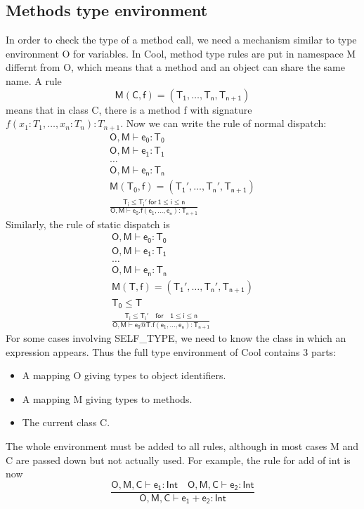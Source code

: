 \subsection{Methods type environment}
In order to check the type of a method call, we need a mechanism similar to type environment O for variables. In Cool, method type rules are put in namespace M differnt from O, which means that a method and an object can share the same name. A rule 
\begin{equation*}
\mathsf{M(C,f) = (T_1,\dots,T_n,T_{n+1})}
\end{equation*}
means that in class C, there is a method f with signature $f(x_1:T_1,\dots,x_n:T_n):T_{n+1}$. Now we can write the rule of normal dispatch:
\begin{gather*}
\mathsf{O,M\vdash e_0:T_0}\\
\mathsf{O,M\vdash e_1:T_1}\\
\dots\\
\mathsf{O,M\vdash e_n:T_n}\\
\mathsf{M(T_0,f) = (T_1',\dots,T_n', T_{n+1})}\\
\mathsf{\frac{T_i\leq T_i'\:for\:1\leq i \leq n}{O,M\vdash e_0.f(e_1,\dots,e_n):T_{n+1}}}
\end{gather*}
Similarly, the rule of static dispatch is 
\begin{gather*}
\mathsf{O,M\vdash e_0:T_0}\\
\mathsf{O,M\vdash e_1:T_1}\\
\dots\\
\mathsf{O,M\vdash e_n:T_n}\\
\mathsf{M(T,f) = (T_1',\dots,T_n',T_{n+1})}\\
\mathsf{T_0\leq T}\\
\mathsf{\frac{T_i\leq T_i'\quad for\quad1\leq i \leq n}{O,M\vdash e_0@T.f(e_1,\dots,e_n): T_{n+1}}}
\end{gather*}
For some cases involving \textsf{SELF\_TYPE}, we need to know the class in which an expression appears. Thus the full type environment of Cool contains 3 parts:
\begin{itemize}
\item A mapping O giving types to object identifiers.
\item A mapping M giving types to methods.
\item The current class C.
\end{itemize}
The whole environment must be added to all rules, although in most cases M and C are passed down but not actually used. For example, the rule for add of int is now
\begin{equation}\label{intaddrule}
\mathsf{\frac{O,M,C\vdash e_1:Int\quad O,M,C\vdash e_2:Int}{O,M,C\vdash e_1+e_2:Int}}
\end{equation}
